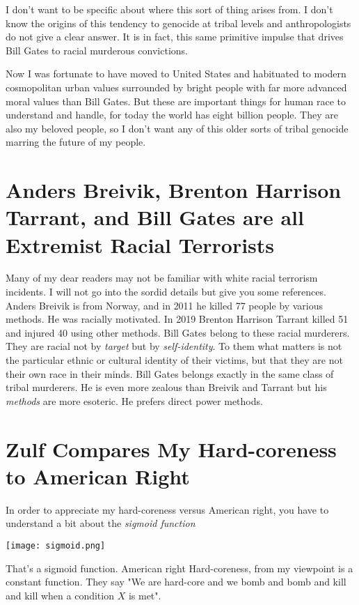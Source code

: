 \documentclass{amsart}
\begin{document}
I don't want to be specific about where this sort of thing arises from.  I don't know the origins of this tendency to genocide at tribal levels and anthropologists do not give a clear answer.  It is in fact, this same primitive impulse that drives Bill Gates to racial murderous convictions.  

Now I was fortunate to have moved to United States and habituated to modern cosmopolitan urban values surrounded by bright people with far more advanced moral values than Bill Gates.  But these are important things for human race to understand and handle, for today the world has eight billion people.  They are also my beloved people, so I don't want any of this older sorts of tribal genocide marring the future of my people.
 
\section{Anders Breivik, Brenton Harrison Tarrant, and Bill Gates are all Extremist Racial Terrorists}
 
Many of my dear readers may not be familiar with white racial terrorism incidents.  I will not go into the sordid details but give you some references. Anders Breivik is from Norway, and in 2011 he killed 77 people by various methods.  He was racially motivated.  In 2019 Brenton Harrison Tarrant killed 51 and injured 40 using other methods.  Bill Gates belong to these racial murderers.  They are racial not by {\em target} but by {\em self-identity}.  To them what matters is not the particular ethnic or cultural identity of their victims, but that they are not their own race in their minds.  Bill Gates belongs exactly in the same class of tribal murderers.  He is even more zealous than Breivik and Tarrant but his {\em methods} are more esoteric.  He prefers direct power methods.

\section{Zulf Compares My Hard-coreness to American Right}

In order to appreciate my hard-coreness versus American right, you have to understand a bit about the {\em sigmoid function}

\texttt{[image: sigmoid.png]}

That's a sigmoid function. American right Hard-coreness, from my viewpoint is a constant function.  They say "We are hard-core and we bomb and bomb and kill and kill when a condition $X$ is met".  
\end{document}
